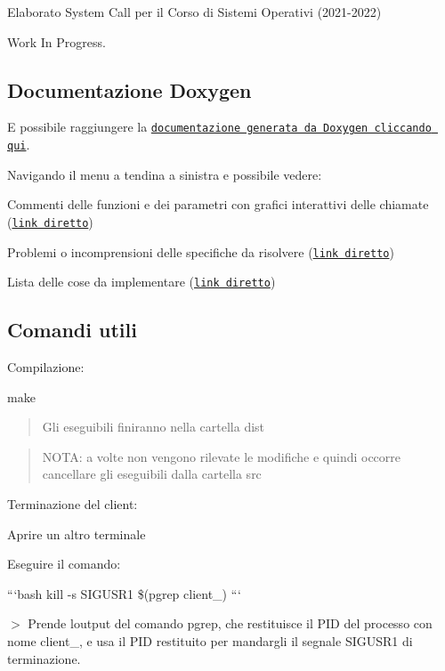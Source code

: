 Elaborato System Call per il Corso di Sistemi Operativi (2021-\/2022) 



Work In Progress.

\subsection*{Documentazione Doxygen}

E\textquotesingle{} possibile raggiungere la \href{https://zfd-progetti-univr-2021-2022.github.io/system_call/doxygen/html/index.html}{\tt documentazione generata da Doxygen cliccando qui}.

Navigando il menu\textquotesingle{} a tendina a sinistra e\textquotesingle{} possibile vedere\+:
\begin{DoxyItemize}
\item Commenti delle funzioni e dei parametri con grafici interattivi delle chiamate (\href{https://zfd-progetti-univr-2021-2022.github.io/system_call/doxygen/html/files.html}{\tt link diretto})
\item Problemi o incomprensioni delle specifiche da risolvere (\href{https://zfd-progetti-univr-2021-2022.github.io/system_call/doxygen/html/warning.html}{\tt link diretto})
\item Lista delle cose da implementare (\href{https://zfd-progetti-univr-2021-2022.github.io/system_call/doxygen/html/todo.html}{\tt link diretto})
\end{DoxyItemize}

\subsection*{Comandi utili}

Compilazione\+: 
\begin{DoxyCode}
make
\end{DoxyCode}
 \begin{quote}
Gli eseguibili finiranno nella cartella {\ttfamily dist} \end{quote}


\begin{quote}
N\+O\+TA\+: a volte non vengono rilevate le modifiche e quindi occorre cancellare gli eseguibili dalla cartella src \end{quote}


Terminazione del client\+:
\begin{DoxyEnumerate}
\item Aprire un altro terminale
\item Eseguire il comando\+:

```bash kill -\/s S\+I\+G\+U\+S\+R1 \$(pgrep client\+\_) ```

$>$ Prende l\textquotesingle{}output del comando pgrep, che restituisce il P\+ID del processo con nome client\+\_, e usa il P\+ID restituito per mandargli il segnale S\+I\+G\+U\+S\+R1 di terminazione. 
\end{DoxyEnumerate}